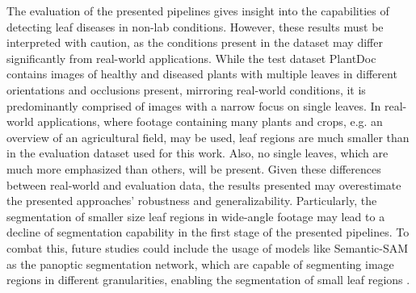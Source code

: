 \documentclass[draft,final]{vutinfth} %
\begin{document}
The evaluation of the presented pipelines gives insight into the capabilities of detecting leaf diseases in non-lab conditions. However, these results must be interpreted with caution, as the conditions present in the dataset may differ significantly from real-world applications. While the test dataset PlantDoc \cite{singh_plantdoc_2020} contains images of healthy and diseased plants with multiple leaves in different orientations and occlusions present, mirroring real-world conditions, it is predominantly comprised of images with a narrow focus on single leaves. In real-world applications, where footage containing many plants and crops, e.g. an overview of an agricultural field, may be used, leaf regions are much smaller than in the evaluation dataset used for this work. Also, no single leaves, which are much more emphasized than others, will be present. Given these differences between real-world and evaluation data, the results presented may overestimate the presented approaches' robustness and generalizability. Particularly, the segmentation of smaller size leaf regions in wide-angle footage may lead to a decline of segmentation capability in the first stage of the presented pipelines. To combat this, future studies could include the usage of models like Semantic-SAM as the panoptic segmentation network, which are capable of segmenting image regions in different granularities, enabling the segmentation of small leaf regions \cite{li_semantic-sam_2023}.
\end{document}
